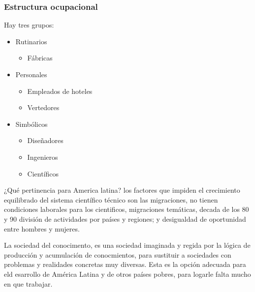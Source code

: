 \subsubsection{Estructura ocupacional}
Hay tres grupos:
\begin{itemize}
    \item Rutinarios \begin{itemize}
        \item Fábricas
    \end{itemize}
    \item Personales \begin{itemize}
        \item Empleados de hoteles
        \item Vertedores
    \end{itemize}
    \item Simbólicos \begin{itemize}
        \item Diseñadores
        \item Ingenieros
        \item Científicos
    \end{itemize}
\end{itemize}
¿Qué pertinencia para America latina? los factores que impiden el crecimiento equilibrado del sistema científico técnico son las migraciones, no tienen condiciones laborales para los cientificos, migraciones temáticas, decada de los 80 y 90 división de actividades por países y regiones; y desigualdad de oportunidad entre hombres y mujeres.

La sociedad del conocimento, es una sociedad imaginada y regida por la lógica de producción y acumulación de conocmientos, para sustituir a sociedades con problemas y realidades concretas muy diversas. Esta es la opción adecuada para eld esarrollo de América Latina y de otros países pobres, para logarle falta mucho en que trabajar.


